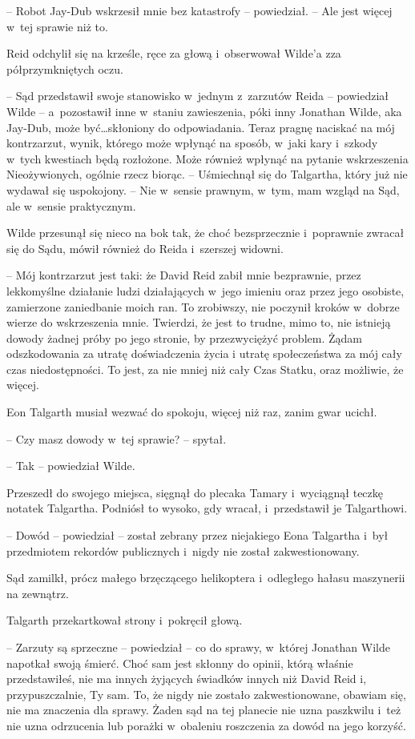 \documentclass[oneside,polish,11pt,sfheadings]{mwbk}
\begin{document}
-- Robot Jay-Dub wskrzesił mnie bez katastrofy -- powiedział. -- Ale jest
więcej w~tej sprawie niż to.

Reid odchylił się na krześle, ręce za głową i~obserwował Wilde'a zza
półprzymkniętych oczu.

-- Sąd przedstawił swoje stanowisko w~jednym z~zarzutów Reida -- powiedział Wilde -- a~pozostawił inne w~staniu zawieszenia, póki inny
Jonathan Wilde, aka Jay-Dub, może być\ldots skłoniony do odpowiadania.
Teraz pragnę naciskać na mój kontrzarzut, wynik, którego może wpłynąć na
sposób, w~jaki kary i~szkody w~tych kwestiach będą rozłożone. Może
również wpłynąć na pytanie wskrzeszenia Nieożywionych, ogólnie rzecz
biorąc. -- Uśmiechnął się do Talgartha, który już nie wydawał się
uspokojony. -- Nie w~sensie prawnym, w~tym, mam wzgląd na Sąd, ale w~sensie praktycznym.

Wilde przesunął się nieco na bok tak, że choć bezsprzecznie i~poprawnie
zwracał się do Sądu, mówił również do Reida i~szerszej widowni.

-- Mój kontrzarzut jest taki: że David Reid zabił mnie bezprawnie, przez
lekkomyślne działanie ludzi działających w~jego imieniu oraz przez jego
osobiste, zamierzone zaniedbanie moich ran. To zrobiwszy, nie poczynił
kroków w~dobrze wierze do wskrzeszenia mnie. Twierdzi, że jest to
trudne, mimo to, nie istnieją dowody żadnej próby po jego stronie, by
przezwyciężyć problem. Żądam odszkodowania za utratę doświadczenia życia
i utratę społeczeństwa za mój cały czas niedostępności. To jest, za nie
mniej niż cały Czas Statku, oraz możliwie, że więcej.

Eon Talgarth musiał wezwać do spokoju, więcej niż raz, zanim gwar
ucichł.

-- Czy masz dowody w~tej sprawie? -- spytał.

-- Tak -- powiedział Wilde.

Przeszedł do swojego miejsca, sięgnął do plecaka Tamary i~wyciągnął
teczkę notatek Talgartha. Podniósł to wysoko, gdy wracał, i~przedstawił
je Talgarthowi.

-- Dowód -- powiedział -- został zebrany przez niejakiego Eona Talgartha i~był przedmiotem rekordów publicznych i~nigdy nie został zakwestionowany.

Sąd zamilkł, prócz małego brzęczącego helikoptera i~odległego hałasu
maszynerii na zewnątrz.

Talgarth przekartkował strony i~pokręcił głową. 

-- Zarzuty są sprzeczne -- powiedział -- co do sprawy, w~której Jonathan Wilde napotkał swoją
śmierć. Choć sam jest skłonny do opinii, którą właśnie przedstawiłeś,
nie ma innych żyjących świadków innych niż David Reid i,
przypuszczalnie, Ty sam. To, że nigdy nie zostało zakwestionowane,
obawiam się, nie ma znaczenia dla sprawy. Żaden sąd na tej planecie nie
uzna paszkwilu i~też nie uzna odrzucenia lub porażki w~obaleniu
roszczenia za dowód na jego korzyść.
\end{document}
